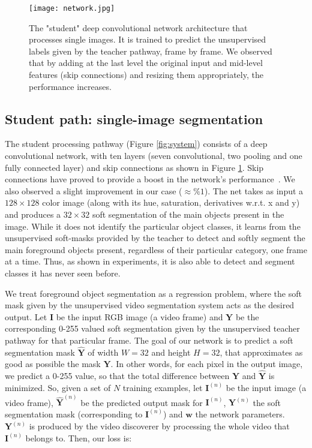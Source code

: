 \documentclass[10pt,twocolumn,letterpaper]{article}
\begin{document}
\begin{figure}[t]
\begin{center}
   \texttt{[image: network.jpg]}
\end{center}
   \caption{The "student" deep convolutional network architecture that processes single images. It is trained to predict the unsupervised labels given by the teacher pathway, frame by frame. We observed that by adding at the last level the original input and mid-level features (skip connections) and resizing them appropriately, the performance increases.
   }
\label{fig:network}
\end{figure}

\subsection{Student path: single-image segmentation}
\label{sec:cnn}

The student processing pathway (Figure \ref{fig:system}) consists
of a deep convolutional network, with ten layers (seven convolutional, two pooling and one fully connected layer) and skip connections as shown in Figure \ref{fig:network}. 
Skip connections have proved to provide a boost in the network's performance~\cite{raiko2012deep, pinheiro2016learning}. We also observed a slight improvement in our case ($\approx \%1$). The net takes as input a $128\times128$ color image (along with its hue, saturation, derivatives w.r.t. x and y)
and produces a $32\times32$ soft segmentation of the main objects present in the image. 
While it does not identify the particular object classes, it learns from the unsupervised soft-masks provided by the teacher to detect and softly segment the main foreground objects present, regardless of their particular category, one frame at a time. Thus, as shown in experiments, it is also able to detect and segment classes it has never seen before.

We treat foreground object segmentation as a regression problem,
where the soft mask given by the unsupervised video segmentation system acts as the
desired output. Let $\mathbf{I}$ be the input RGB image (a video frame) and $\mathbf{Y}$ be the
corresponding 0-255 valued soft segmentation given by the unsupervised teacher pathway for that particular frame. 
The goal of our network is to predict a soft segmentation mask
$\mathbf{\hat{Y}}$ of width $W=32$ and height $H=32$, that approximates as good as possible the mask 
$\mathbf{Y}$. In other words, for each pixel in the output image, 
we predict a 0-255 value, so that the total difference between 
$\mathbf{Y}$ and $\mathbf{\hat{Y}}$ is minimized. So, given a set of 
$N$ training examples, let $\mathbf{I}^{(n)}$ be the input image (a video frame), ${\mathbf{\hat{Y}}}^{(n)}$ be the 
predicted output mask for $\mathbf{I}^{(n)}$, 
$\mathbf{Y}^{(n)}$ the soft segmentation mask (corresponding to $\mathbf{I}^{(n)}$) and  $\mathbf{w}$ the network parameters.  $\mathbf{Y}^{(n)}$ is produced by the video discoverer by processing the whole video that $\mathbf{I}^{(n)}$ belongs to. Then, our loss is:
\end{document}

